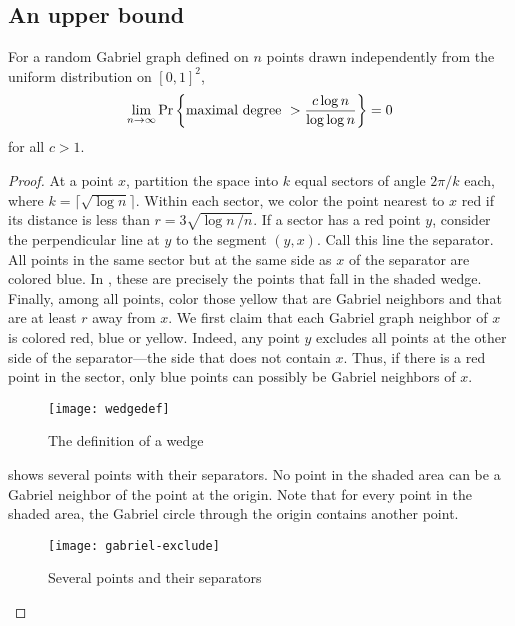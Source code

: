 \documentclass[lotsofwhite,charterfonts]{patmorin}
\newcommand{\PROB}{\Pr}
\begin{document}
\subsection{An upper bound}

\begin{thm}
For a random Gabriel graph defined on $n$ points drawn
independently from the uniform distribution on
$[0,1]^2$, 
\[
\lim_{n\to\infty} \PROB \left\{ \hbox{\rm maximal degree}~> {c \log n \over
\log \log n} \right\} = 0
\]
for all $c > 1$.
\end{thm}

\begin{proof}
At a point $x$, partition the space into $k$ equal
sectors of angle $2\pi/k$ each, where $k = \lceil \sqrt{\log n} \rceil$.
Within each sector, we color the point nearest to $x$ 
red if its distance is less than $r = 3 \sqrt{\log n\, /n}$.
If a sector has a red point $y$, consider the perpendicular
line at $y$ to the segment $(y,x)$. Call this
line the separator. All points
in the same sector but at the same side as $x$ of the separator
are colored blue. In , these are precisely the points that
fall in the shaded wedge.
Finally, among all points, color those yellow that are
Gabriel neighbors and that are at least $r$ away from $x$.
We first claim that each Gabriel graph neighbor of $x$
is colored red, blue or yellow.
Indeed, any point $y$ excludes all points at the
other side of the separator---the side that does not contain $x$.
Thus, if there is a red point in the sector, only blue points
can possibly be Gabriel neighbors of $x$.


\begin{figure}
\begin{center}\texttt{[image: wedgedef]}\end{center}
\caption{The definition of a wedge}
\end{figure}

 shows several points with their separators.
No point in the shaded area can be a Gabriel neighbor of the point at the
origin. Note that for every point in the shaded area, the Gabriel circle
through the origin contains another point.

\begin{figure}
\begin{center}\texttt{[image: gabriel-exclude]}\end{center}
\caption{Several points and their separators}
\end{figure}


\end{proof}
\end{document}
